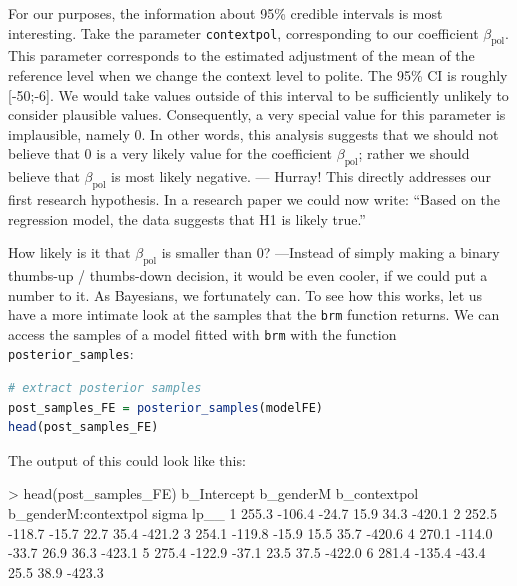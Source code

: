 \documentclass[nobib]{tufte-handout}
\begin{document}
For our purposes, the information about 95\% credible intervals is most interesting. Take the parameter \texttt{contextpol}, corresponding to our coefficient $\beta_{\text{pol}}$. This parameter corresponds to the estimated adjustment of the mean of the reference level when we change the context level to polite. The 95\% CI is roughly [-50;-6]. We would take values outside of this interval to be sufficiently unlikely to consider plausible values. Consequently, a very special value for this parameter is implausible, namely 0. In other words, this analysis suggests that we should not believe that 0 is a very likely value for the coefficient $\beta_{\text{pol}}$; rather we should believe that $\beta_{\text{pol}}$ is most likely negative. --- Hurray! This directly addresses our first research hypothesis. In a research paper we could now write: ``Based on the regression model, the data suggests that H1 is likely true.''

How likely is it that $\beta_{\text{pol}}$ is smaller than 0? ---Instead of simply making a binary thumbs-up / thumbs-down decision, it would be even cooler, if we could put a number to it. As Bayesians, we fortunately can. To see how this works, let us have a more intimate look at the samples that the \texttt{brm} function returns. We can access the samples of a model fitted with \texttt{brm} with the function \texttt{posterior\_samples}:

\begin{minipage}[]{\textwidth}
\begin{lstlisting}[language=R]
# extract posterior samples 
post_samples_FE = posterior_samples(modelFE)
head(post_samples_FE)
\end{lstlisting}
\end{minipage}

The output of this could look like this:

\medskip

\begin{minipage}[]{1.2\textwidth}
\begin{rc}
> head(post_samples_FE)
  b_Intercept b_genderM b_contextpol b_genderM:contextpol    sigma      lp__
1    255.3 -106.4    -24.7             15.9 34.3 -420.1
2    252.5 -118.7    -15.7           22.7 35.4 -421.2
3    254.1 -119.8    -15.9            15.5 35.7 -420.6
4    270.1 -114.0    -33.7            26.9 36.3 -423.1
5    275.4 -122.9    -37.1           23.5 37.5 -422.0
6    281.4 -135.4    -43.4             25.5 38.9 -423.3
\end{rc}
\end{minipage}
\end{document}
